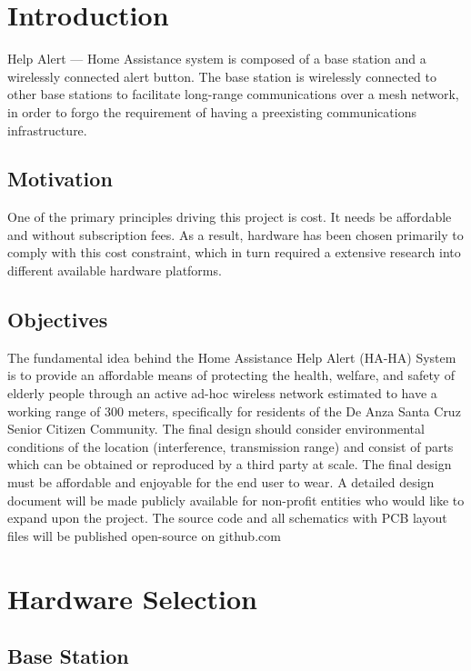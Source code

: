 \documentclass[journal,compsoc]{IEEEtran}
\begin{document}
\section{Introduction}
 Help Alert --- Home Assistance system is composed of a base station and a wirelessly connected alert button.  The base station is wirelessly connected to other base stations to facilitate long-range communications over a mesh network, in order to forgo the requirement of having a preexisting communications infrastructure.

\subsection{Motivation}
One of the primary principles driving this project is cost.  It needs be affordable and without subscription fees.  As a result, hardware has been chosen primarily to comply with this cost constraint, which in turn required a extensive research into different available hardware platforms.

\subsection{Objectives}
The fundamental idea behind the Home Assistance Help Alert (HA-HA) System is to provide an affordable means of protecting the health, welfare, and safety of elderly people through an active ad-hoc wireless network estimated to have a working range of 300 meters, specifically for residents of the De Anza Santa Cruz Senior Citizen Community.  The final design should consider environmental conditions of the location (interference, transmission range) and consist of parts which can be obtained or reproduced by a third party at scale.  The final design must be affordable and enjoyable for the end user to wear.  A detailed design document will be made publicly available for non-profit entities who would like to expand upon the project. The source code and all schematics with PCB layout files will be published open-source on github.com

\section{Hardware Selection}

\subsection{Base Station}
\end{document}
